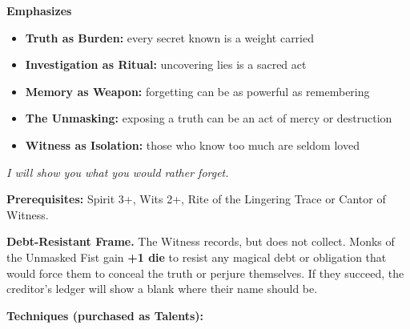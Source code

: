 \noindent\textbf{Emphasizes}
\begin{itemize}
  \item \textbf{Truth as Burden:} every secret known is a weight carried
  \item \textbf{Investigation as Ritual:} uncovering lies is a sacred act
  \item \textbf{Memory as Weapon:} forgetting can be as powerful as remembering
  \item \textbf{The Unmasking:} exposing a truth can be an act of mercy or destruction
  \item \textbf{Witness as Isolation:} those who know too much are seldom loved
\end{itemize}

\begin{tcolorbox}[colback=black!5,colframe=yellow!70!black,title=\textbf{Unmasked Fist (The Witness)},breakable]
  \emph{I will show you what you would rather forget.}

  \vspace{2mm}
  \noindent\textbf{Prerequisites:} Spirit 3+, Wits 2+, Rite of the Lingering Trace or Cantor of Witness.

  \vspace{2mm}
  \noindent\textbf{Debt-Resistant Frame.} The Witness records, but does not collect. Monks of the Unmasked Fist gain \textbf{+1 die} to resist any magical debt or obligation that would force them to conceal the truth or perjure themselves. If they succeed, the creditor's ledger will show a blank where their name should be.

  \vspace{2mm}
  \noindent\textbf{Techniques (purchased as Talents):}


\end{tcolorbox}
